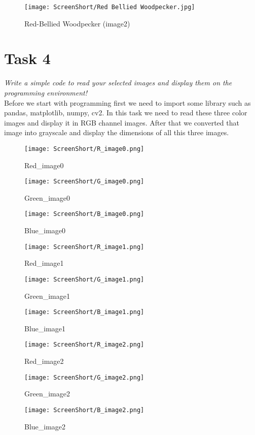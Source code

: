 \documentclass[conference,12pt]{IEEEtran}
\begin{document}
\begin{figure}[h]
    \centering
    \texttt{[image: ScreenShort/Red Bellied Woodpecker.jpg]}
    \caption{Red-Bellied Woodpecker (image2)}
\end{figure}

\section{Task 4}
\textit{Write a simple code to read your selected images and display them on the programming environment!}\\
Before we start with programming first we need to import some library such as pandas, matplotlib, numpy, cv2. In this task we need to read these three color images and display it in RGB channel images. After that we converted that image into grayscale and display the dimensions of all this three images.
\begin{figure}[h]
    \centering
\texttt{[image: ScreenShort/R\_image0.png]}
    \caption{Red\_image0}
\end{figure}
\begin{figure}[h]
    \centering
    \texttt{[image: ScreenShort/G\_image0.png]}
    \caption{Green\_image0}
\end{figure}
\begin{figure}[h]
    \centering
    \texttt{[image: ScreenShort/B\_image0.png]}
    \caption{Blue\_image0}
\end{figure}

\begin{figure}[h]
    \centering
    \texttt{[image: ScreenShort/R\_image1.png]}
    \caption{Red\_image1}
\end{figure}
\begin{figure}[h]
    \centering
    \texttt{[image: ScreenShort/G\_image1.png]}
    \caption{Green\_image1}
\end{figure}
\begin{figure}[h]
    \centering
    \texttt{[image: ScreenShort/B\_image1.png]}
    \caption{Blue\_image1}
\end{figure}

\begin{figure}[h]
    \centering
    \texttt{[image: ScreenShort/R\_image2.png]}
    \caption{Red\_image2}
\end{figure}
\begin{figure}[h]
    \centering
    \texttt{[image: ScreenShort/G\_image2.png]}
    \caption{Green\_image2}
\end{figure}
\begin{figure}[h]
    \centering
    \texttt{[image: ScreenShort/B\_image2.png]}
    \caption{Blue\_image2}
\end{figure}
\end{document}
